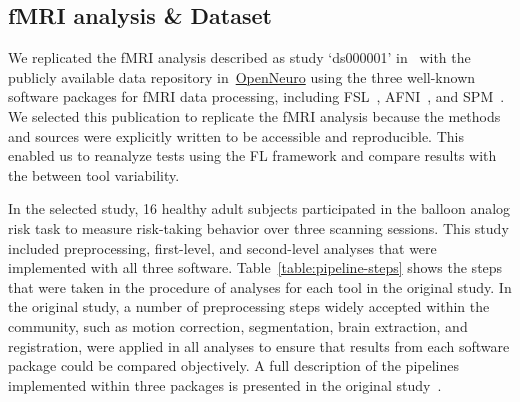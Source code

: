 \documentclass[conference]{IEEEtran}
\begin{document}


\subsection{fMRI analysis \& Dataset}

We replicated the fMRI analysis described as study `ds000001' in~\cite{bowring2019exploring}
with the publicly available data repository in~\href{https://openneuro.org/datasets/ds000001}{OpenNeuro}
using the three well-known software packages for fMRI data processing, including
FSL~\cite{jenkinson2012fsl}, AFNI~\cite{cox1996afni}, and SPM~\cite{penny2011statistical}.
We selected this publication to replicate the fMRI analysis because the methods and sources were explicitly
written to be accessible and reproducible. This enabled us to reanalyze tests using the FL framework and
compare results with the between tool variability.

In the selected study, 16 healthy adult subjects participated in the balloon analog risk task to measure
risk-taking behavior over three scanning sessions.
This study included preprocessing, first-level, and second-level analyses that were implemented with all three software.
Table~\ref{table:pipeline-steps} shows the steps that were taken in the procedure of analyses for each tool in the original study.
In the original study, a number of preprocessing steps widely accepted within the community, such as motion correction,
segmentation, brain extraction, and registration, were applied in all analyses to ensure that results from each software
package could be compared objectively.
A full description of the pipelines implemented within three packages is presented in the original
study~\cite{bowring2019exploring,schonberg2012decreasing}.
\end{document}
